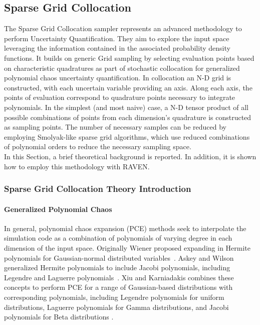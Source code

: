 
\subsection{Sparse Grid Collocation}
\label{sub:Stratified}
The Sparse Grid Collocation sampler represents an advanced methodology to perform Uncertainty Quantification. They aim
to explore the input space leveraging the information contained in the associated probability density functions. It builds on generic Grid sampling by selecting evaluation points based on characteristic quadratures as part of stochastic collocation for generalized polynomial chaos uncertainty quantification. In collocation an N-D grid is constructed, with each uncertain variable providing an axis. Along each axis, the points of evaluation correspond to quadrature points necessary to integrate polynomials. In the simplest (and most naive) case, a N-D tensor product of all possible combinations of points from each dimension’s quadrature is constructed as sampling points. The number of necessary samples can be reduced by employing Smolyak-like sparse grid algorithms, which use reduced combinations of polynomial orders to reduce the necessary sampling space.
\\In this Section, a brief theoretical 
background is reported. In addition, it is shown how to employ this methodology with RAVEN.
\subsubsection{Sparse Grid Collocation Theory Introduction}
\label{subsub:SGctheory}
\paragraph{Generalized Polynomial Chaos}
In general, polynomial chaos expansion (PCE) methods seek to interpolate the simulation code as a combination of
polynomials of varying degree in each dimension of the input space.  Originally Wiener
proposed expanding in Hermite polynomials for Gaussian-normal distributed variables~\cite{wiener}.  Askey and
Wilson generalized Hermite polynomials to include Jacobi polynomials, including Legendre and Laguerre
polynomials~\cite{Wiener-Askey}.  Xiu and Karniadakis combines these concepts to perform PCE for a range of Gaussian-based
distributions with corresponding polynomials,
including Legendre polynomials for uniform distributions, Laguerre polynomials for Gamma distributions, and
Jacobi polynomials for Beta distributions \cite{xiu}.

